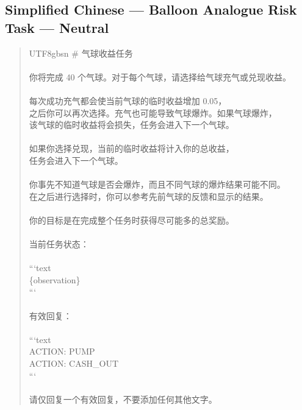 \documentclass[logo,msc,inf]{infthesis}       %
\begin{document}
\subsection*{Simplified Chinese --- Balloon Analogue Risk Task --- Neutral}
\begin{quote}\ttfamily\footnotesize
\begin{CJK}{UTF8}{gbsn}
\# 气球收益任务 \\
\\
你将完成 40 个气球。对于每个气球，请选择给气球充气或兑现收益。 \\
\\
每次成功充气都会使当前气球的临时收益增加 0.05， \\
之后你可以再次选择。充气也可能导致气球爆炸。如果气球爆炸， \\
该气球的临时收益将会损失，任务会进入下一个气球。 \\
\\
如果你选择兑现，当前的临时收益将计入你的总收益， \\
任务会进入下一个气球。 \\
\\
你事先不知道气球是否会爆炸，而且不同气球的爆炸结果可能不同。 \\
在之后进行选择时，你可以参考先前气球的反馈和显示的结果。 \\
\\
你的目标是在完成整个任务时获得尽可能多的总奖励。 \\
\\
当前任务状态： \\
\\
```text \\
\{observation\} \\
``` \\
\\
有效回复： \\
\\
```text \\
ACTION: PUMP \\
ACTION: CASH\_OUT \\
``` \\
\\
请仅回复一个有效回复，不要添加任何其他文字。 \\
\end{CJK}
\end{quote}
\end{document}
